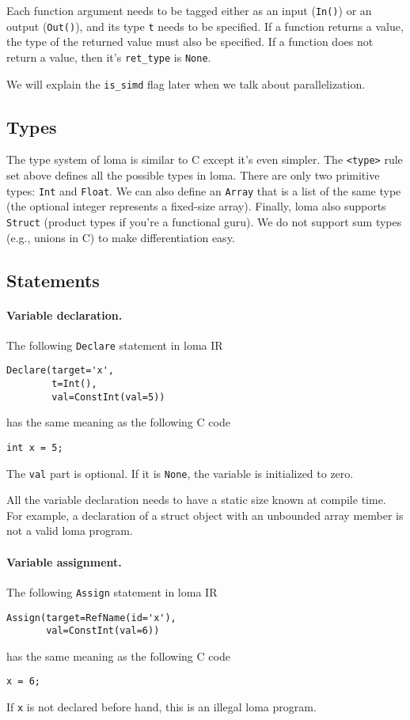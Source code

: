 Each function argument needs to be tagged either as an input (\lstinline{In()}) or an output (\lstinline{Out()}), and its type \lstinline{t} needs to be specified. If a function returns a value, the type of the returned value must also be specified. If a function does not return a value, then it's \lstinline{ret_type} is \lstinline{None}.

We will explain the \lstinline{is_simd} flag later when we talk about parallelization.

\subsection{Types}

The type system of loma is similar to C except it's even simpler. The \lstinline{<type>} rule set above defines all the possible types in loma. There are only two primitive types: \lstinline{Int} and \lstinline{Float}. We can also define an \lstinline{Array} that is a list of the same type (the optional integer represents a fixed-size array). Finally, loma also supports \lstinline{Struct} (product types if you're a functional guru). We do not support sum types (e.g., unions in C) to make differentiation easy.

\subsection{Statements}

\paragraph{Variable declaration.}
The following \lstinline{Declare} statement in loma IR
\begin{lstlisting}
Declare(target='x',
        t=Int(),
        val=ConstInt(val=5))
\end{lstlisting}
has the same meaning as the following C code
\begin{lstlisting}
int x = 5;
\end{lstlisting}

The \lstinline{val} part is optional. If it is \lstinline{None}, the variable is initialized to zero. 

All the variable declaration needs to have a static size known at compile time. For example, a declaration of a struct object with an unbounded array member is not a valid loma program. 

\paragraph{Variable assignment.}
The following \lstinline{Assign} statement in loma IR
\begin{lstlisting}
Assign(target=RefName(id='x'),
       val=ConstInt(val=6))
\end{lstlisting}
has the same meaning as the following C code
\begin{lstlisting}
x = 6;
\end{lstlisting}
If \lstinline{x} is not declared before hand, this is an illegal loma program.

